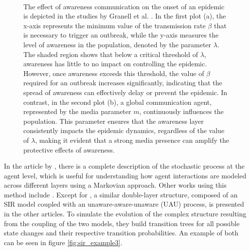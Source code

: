 \begin{figure}[h]
	\centering
	 \quad
	 \\
	\caption[Metacritical effect]{The effect of awareness communication on the onset of an epidemic is depicted in the studies by Granell et al. \cite{Granell2013, Granell_2014}. In the first plot (a), the x-axis represents the minimum value of the transmission rate $\beta$ that is necessary to trigger an outbreak, while the y-axis measures the level of awareness in the population, denoted by the parameter $\lambda$. The shaded region shows that below a critical threshold of $\lambda$, awareness has little to no impact on controlling the epidemic. However, once awareness exceeds this threshold, the value of $\beta$ required for an outbreak increases significantly, indicating that the spread of awareness can effectively delay or prevent the epidemic. In contrast, in the second plot (b), a global communication agent, represented by the media parameter $m$, continuously influences the population. This parameter ensures that the awareness layer consistently impacts the epidemic dynamics, regardless of the value of $\lambda$, making it evident that a strong media presence can amplify the protective effects of awareness.}
	\label{fig:sir_example2}
\end{figure}


In the article by \cite{Sahneh2013}, there is a complete description of the stochastic process at the agent level, which is useful for understanding how agent interactions are modeled across different layers using a Markovian approach. Other works using this method include \cite{Silva2019, Frieswijk_2022, Peng2021, Zuo_2021}. Except for \cite{Frieswijk_2022}, a similar double-layer structure, composed of an SIR model coupled with an unaware-aware-unaware (UAU) process, is presented in the other articles. To simulate the evolution of the complex structure resulting from the coupling of the two models, they build transition trees for all possible state changes and their respective transition probabilities. An example of both can be seen in figure \ref{fig:sir_example3}.  

